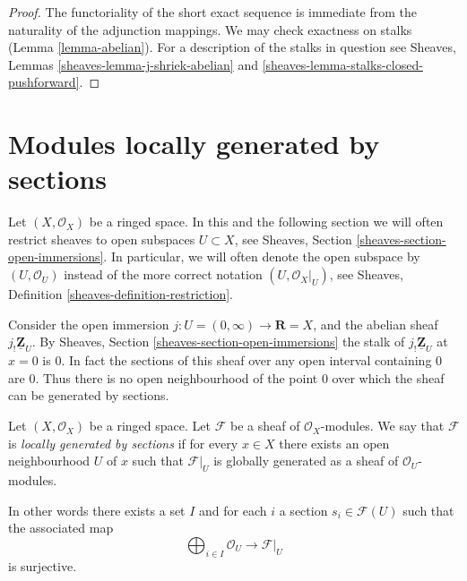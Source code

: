 \begin{proof}
The functoriality of the short exact sequence is
immediate from the naturality of the adjunction mappings.
We may check exactness on stalks (Lemma \ref{lemma-abelian}).
For a description of the stalks in question see
Sheaves, Lemmas \ref{sheaves-lemma-j-shriek-abelian}
and \ref{sheaves-lemma-stalks-closed-pushforward}.
\end{proof}








\section{Modules locally generated by sections}
\label{section-locally-generated}

\noindent
Let $(X, \mathcal{O}_X)$ be a ringed space.
In this and the following section we will often restrict
sheaves to open subspaces $U \subset X$, see
Sheaves, Section \ref{sheaves-section-open-immersions}.
In particular, we will often denote the open subspace
by $(U, \mathcal{O}_U)$ instead of the more correct
notation $(U, \mathcal{O}_X|_U)$, see
Sheaves, Definition \ref{sheaves-definition-restriction}.

\medskip\noindent
Consider the open immersion
$j : U = (0 , \infty) \to \mathbf{R} = X$, and the abelian sheaf
$j_!\underline{\mathbf{Z}}_U$. By Sheaves, Section
\ref{sheaves-section-open-immersions} the stalk of
$j_!\underline{\mathbf{Z}}_U$ at $x = 0$ is $0$. In fact the
sections of this sheaf over any open interval containing $0$
are $0$. Thus there is no open neighbourhood of the point
$0$ over which the sheaf can be generated by sections.

\begin{definition}
\label{definition-locally-generated}
Let $(X, \mathcal{O}_X)$ be a ringed space.
Let $\mathcal{F}$ be a sheaf of $\mathcal{O}_X$-modules.
We say that $\mathcal{F}$ is {\it locally generated by sections}
if for every $x \in X$ there exists an open
neighbourhood $U$ of $x$ such that $\mathcal{F}|_U$
is globally generated as a sheaf of $\mathcal{O}_U$-modules.
\end{definition}

\noindent
In other words there exists a set $I$ and for
each $i$ a section $s_i \in \mathcal{F}(U)$ such
that the associated map
$$
\bigoplus\nolimits_{i \in I} \mathcal{O}_U
\longrightarrow
\mathcal{F}|_U
$$
is surjective.

